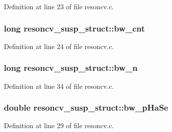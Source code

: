 Definition at line 23 of file resoncv.\+c.

\subsubsection[{\texorpdfstring{bw\+\_\+cnt}{bw_cnt}}]{\setlength{\rightskip}{0pt plus 5cm}long resoncv\+\_\+susp\+\_\+struct\+::bw\+\_\+cnt}\hypertarget{structresoncv__susp__struct_a4b3e7e484e6d898e3fd357220621976a}{}\label{structresoncv__susp__struct_a4b3e7e484e6d898e3fd357220621976a}


Definition at line 24 of file resoncv.\+c.

\subsubsection[{\texorpdfstring{bw\+\_\+n}{bw_n}}]{\setlength{\rightskip}{0pt plus 5cm}long resoncv\+\_\+susp\+\_\+struct\+::bw\+\_\+n}\hypertarget{structresoncv__susp__struct_a8a7fa39d04b0853ba31f4123524c0357}{}\label{structresoncv__susp__struct_a8a7fa39d04b0853ba31f4123524c0357}


Definition at line 34 of file resoncv.\+c.

\subsubsection[{\texorpdfstring{bw\+\_\+p\+Ha\+Se}{bw_pHaSe}}]{\setlength{\rightskip}{0pt plus 5cm}double resoncv\+\_\+susp\+\_\+struct\+::bw\+\_\+p\+Ha\+Se}\hypertarget{structresoncv__susp__struct_a8ffc9a91c9275c25359e0c22c4a8e525}{}\label{structresoncv__susp__struct_a8ffc9a91c9275c25359e0c22c4a8e525}


Definition at line 29 of file resoncv.\+c.

